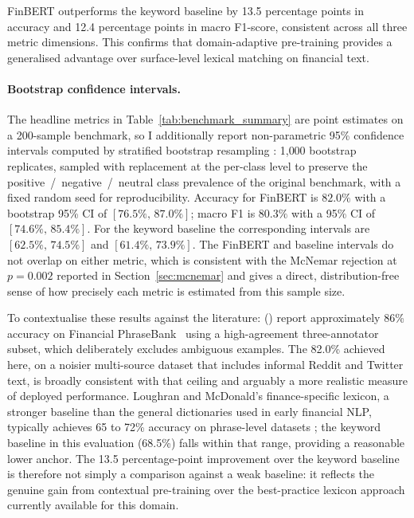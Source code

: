 FinBERT outperforms the keyword baseline by 13.5 percentage points in accuracy and 12.4 percentage points in macro F1-score, consistent across all three metric dimensions.
This confirms that domain-adaptive pre-training provides a generalised advantage over surface-level lexical matching on financial text.

\paragraph{Bootstrap confidence intervals.}
The headline metrics in Table~\ref{tab:benchmark_summary} are point estimates on a 200-sample benchmark, so I additionally report non-parametric 95\% confidence intervals computed by stratified bootstrap resampling \citep{efron1993bootstrap}: 1{,}000 bootstrap replicates, sampled with replacement at the per-class level to preserve the positive~/~negative~/~neutral class prevalence of the original benchmark, with a fixed random seed for reproducibility. Accuracy for FinBERT is $82.0\%$ with a bootstrap 95\% CI of $[76.5\%,\,87.0\%]$; macro F1 is $80.3\%$ with a 95\% CI of $[74.6\%,\,85.4\%]$. For the keyword baseline the corresponding intervals are $[62.5\%,\,74.5\%]$ and $[61.4\%,\,73.9\%]$. The FinBERT and baseline intervals do not overlap on either metric, which is consistent with the McNemar rejection at $p = 0.002$ reported in Section~\ref{sec:mcnemar} and gives a direct, distribution-free sense of how precisely each metric is estimated from this sample size.

To contextualise these results against the literature: \citeauthor{araci2019finbert} (\citeyear{araci2019finbert}) report approximately 86\% accuracy on Financial PhraseBank~\citep{malo2014financialphrasebank} using a high-agreement three-annotator subset, which deliberately excludes ambiguous examples.
The 82.0\% achieved here, on a noisier multi-source dataset that includes informal Reddit and Twitter text, is broadly consistent with that ceiling and arguably a more realistic measure of deployed performance.
Loughran and McDonald's \citeyearpar{loughran2011liability} finance-specific lexicon, a stronger baseline than the general dictionaries used in early financial NLP, typically achieves 65 to 72\% accuracy on phrase-level datasets \citep{malo2014financialphrasebank}; the keyword baseline in this evaluation (68.5\%) falls within that range, providing a reasonable lower anchor.
The 13.5 percentage-point improvement over the keyword baseline is therefore not simply a comparison against a weak baseline: it reflects the genuine gain from contextual pre-training over the best-practice lexicon approach currently available for this domain.

